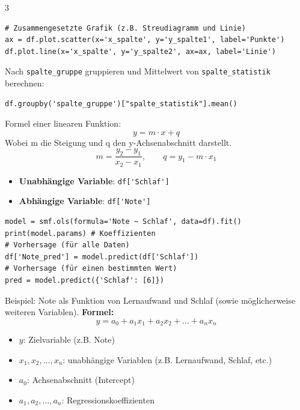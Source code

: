 \begin{landscape}
\begin{multicols*}{3}
\begin{cheatSheetBox}[title=Grafiken erstellen]
\begin{lstlisting}
# Zusammengesetzte Grafik (z.B. Streudiagramm und Linie)
ax = df.plot.scatter(x='x_spalte', y='y_spalte1', label='Punkte')
df.plot.line(x='x_spalte', y='y_spalte2', ax=ax, label='Linie')
\end{lstlisting}
		\end{cheatSheetBox}

		\begin{cheatSheetBox}[title=Gruppieren]
			Nach \texttt{spalte\_gruppe} gruppieren und Mittelwert von \texttt{spalte\_statistik} berechnen:
			\begin{lstlisting}
df.groupby('spalte_gruppe')["spalte_statistik"].mean()
\end{lstlisting}
		\end{cheatSheetBox}
		\columnbreak

		\begin{cheatSheetBox}[title=Lineare Funktion]
			Formel einer linearen Funktion:
			\[y = m \cdot x + q\]
			Wobei m die Steigung und q den y-Achsenabschnitt darstellt.
			\[m=\frac{y_2 - y_1}{x_2 - x_1},\quad\quad q = y_1 - m \cdot x_1\]
		\end{cheatSheetBox}
		\begin{cheatSheetBox}[title=Lineare Regression]
			\begin{itemize}
				\item \textbf{Unabhängige Variable}: \lstinline|df['Schlaf']|
				\item \textbf{Abhängige Variable}: \lstinline|df['Note']|
			\end{itemize}
			\begin{lstlisting}
model = smf.ols(formula='Note ~ Schlaf', data=df).fit()
print(model.params) # Koeffizienten
# Vorhersage (für alle Daten)
df['Note_pred'] = model.predict(df['Schlaf']) 
# Vorhersage (für einen bestimmten Wert)
pred = model.predict({'Schlaf': [6]})
\end{lstlisting}
		\end{cheatSheetBox}

		\begin{cheatSheetBox}[title=Multiple lineare Regression]
			Beispiel: Note als Funktion von Lernaufwand und Schlaf (sowie möglicherweise weiteren Variablen).
			\textbf{Formel:}
			\[
				y = a_0 + a_1 x_1 + a_2 x_2 + \ldots + a_n x_n
			\]
			\begin{itemize}
				\item $y$: Zielvariable (z.B. Note)
				\item $x_1, x_2, \ldots, x_n$: unabhängige Variablen (z.B. Lernaufwand, Schlaf, etc.)
				\item $a_0$: Achsenabschnitt (Intercept)
				\item $a_1, a_2, \ldots, a_n$: Regressionskoeffizienten
			\end{itemize}
		\end{cheatSheetBox}


\end{multicols*}
\end{landscape}
